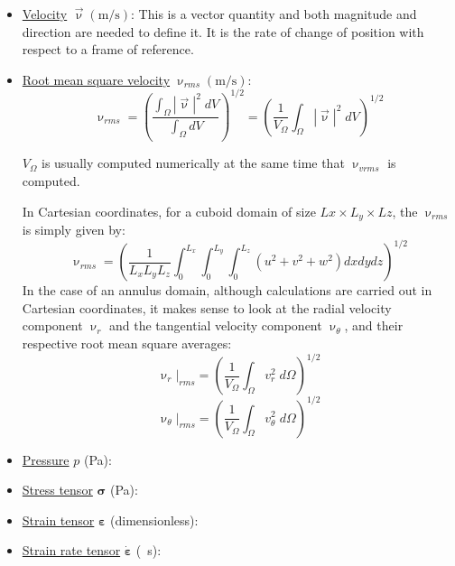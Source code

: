 \begin{itemize}
\item \underline{Velocity} $\vec \upnu (\text{m/s})$: This is a vector quantity and both magnitude and direction are needed to define it. It is the rate of change of position with respect to a frame of reference.
\item \underline{Root mean square velocity} $\upnu_{rms} (\text{m/s})$: 
\begin{equation}
\upnu_{rms} = \left ( \frac{\int_\Omega |{\vec \upnu}|^2 \;  dV}{\int_\Omega dV }  \right )^{1/2}
=\left ( \frac{1}{V_\Omega} \int_\Omega |{\vec \upnu}|^2 \;  dV \right )^{1/2} \label{eqVrms}
\end{equation}
\begin{remark}
$V_\Omega$ is usually computed numerically at the same time that $\upnu_{vrms}$ is computed.
\end{remark}
In Cartesian coordinates, for a cuboid domain of size $Lx\times L_y \times Lz$, 
the $\upnu_{rms}$ is simply given by:
\begin{equation}
\upnu_{rms}  = \left ( \frac{1}{L_xL_yL_z} \int_0^{L_x}\int_0^{L_y}\int_0^{L_z} 
(u^2 + v^2 + w^2) dxdydz  \right )^{1/2}
\end{equation}
In the case of an annulus domain, although calculations are carried out 
in Cartesian coordinates, it makes sense
to look at the radial velocity component $\upnu_r$ and the tangential velocity 
component $\upnu_\theta$, and their respective
root mean square averages:
\begin{equation}
\upnu_r|_{rms}  =\left ( \frac{1}{V_\Omega} \int_\Omega v_r^2 \;  d \Omega \right )^{1/2} \label{eqVrVrms}
\end{equation}
\begin{equation}
\upnu_\theta|_{rms}  = \left ( \frac{1}{V_\Omega} \int_\Omega v_\theta^2 \;  d \Omega \right )^{1/2} \label{eqThetaVrms}
\end{equation}


\item \underline{Pressure} $p$ (\si{\pascal}):
\item \underline{Stress tensor} ${\bm \sigma}$ (\si{\pascal}): 
\item \underline{Strain tensor} ${\bm \varepsilon}$ (dimensionless): 
\item \underline{Strain rate tensor} $ \dot{\bm \varepsilon}$ (\si{\per\second}): 


\end{itemize}
